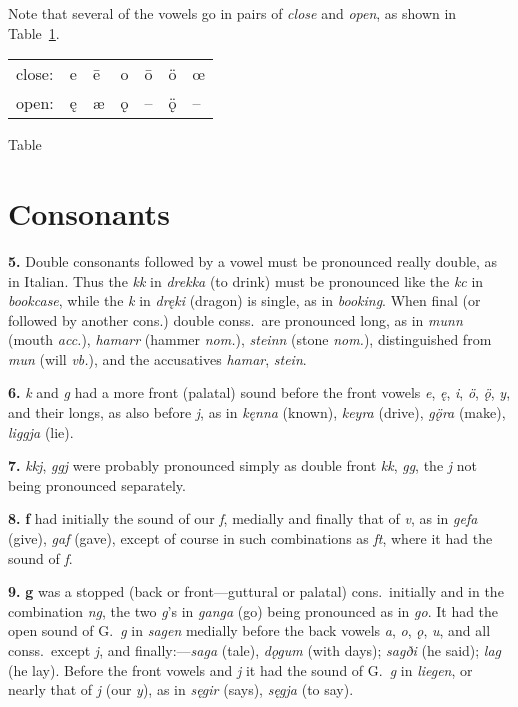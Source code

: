 \documentclass[12pt,letterpaper]{book}
\newcommand\newcaption{\small\refstepcounter{table}%
	\centering Table~\thetable}
\begin{document}
Note that several of the vowels go in pairs of \textit{close} and
\textit{open}, as shown in Table~\ref{tab:4}.

\begin{table}[htbp]
\begin{center}
\begin{tabular}{lllllll}
	close: & e & ē & o & ō & ö & œ\\
	open: & ę & æ & ǫ & -- & ǫ̈ & --\\
\end{tabular}
\end{center}
\newcaption
\label{tab:4}
\end{table}

\section{Consonants}

\textbf{5.} Double consonants followed by a vowel must be pronounced
really double, as in Italian.  Thus the \textit{kk} in \textit{drekka} (to
drink) must be pronounced like the \textit{kc} in \textit{bookcase}, while the
\textit{k} in \textit{dręki} (dragon) is single, as in \textit{booking}.  When final
(or followed by another cons.) double conss.\ are pronounced long,
as in \textit{munn} (mouth \textit{acc.}), \textit{hamarr} (hammer \textit{nom.}),
\textit{steinn} (stone \textit{nom.}), distinguished from \textit{mun} (will
\textit{vb.}), and the accusatives \textit{hamar}, \textit{stein}.

\textbf{6.} \textit{k} and \textit{g} had a more front (palatal) sound before the front
vowels \textit{e}, \textit{ę}, \textit{i}, \textit{ö}, \textit{ǫ̈}, \textit{y}, and their
longs, as also before \textit{j}, as in \textit{kęnna} (known), \textit{keyra}
(drive), \textit{gǫ̈ra} (make), \textit{liggja} (lie).

\textbf{7.} \textit{kkj}, \textit{ggj} were probably pronounced simply as double front
\textit{kk}, \textit{gg}, the \textit{j} not being pronounced separately.

\textbf{8.} {\bf f} had initially the sound of our \textit{f}, medially and finally
that of \textit{v}, as in \textit{gefa} (give), \textit{gaf} (gave), except of
course in such combinations as \textit{ft}, where it had the sound of
\textit{f}.

\textbf{9.} {\bf g} was a stopped (back or front---guttural or palatal)
cons.\ initially and in the combination \textit{ng}, the two \textit{g}'s in
\textit{ganga} (go) being pronounced as in \textit{go}.  It had the open sound of
G.\ \textit{g} in \textit{sagen} medially before the back vowels \textit{a}, \textit{o},
\textit{ǫ}, \textit{u}, and all conss.\ except \textit{j}, and finally:---\textit{saga}
(tale), \textit{dǫgum} (with days); \textit{sagði} (he said); \textit{lag} (he lay).
Before the front vowels and \textit{j} it had the sound of G.\ \textit{g} in
\textit{liegen}, or nearly that of \textit{j} (our \textit{y}), as in \textit{sęgir}
(says), \textit{sęgja} (to say).
\end{document}
